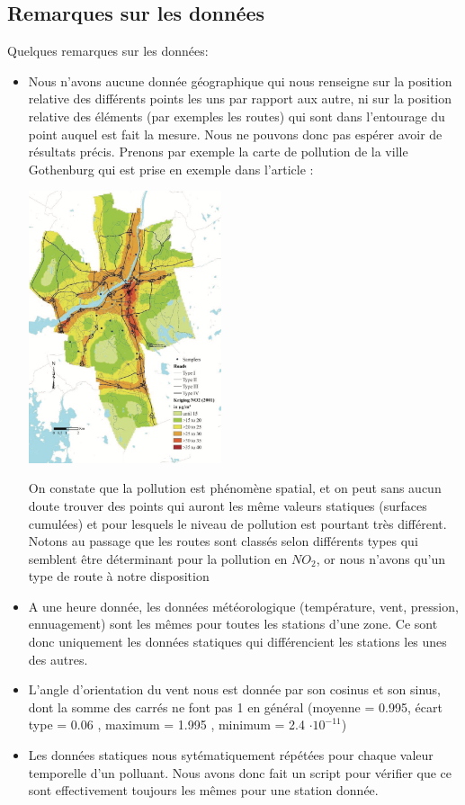 \subsection{Remarques sur les données}
Quelques remarques sur les données:
\begin{itemize}
  \item
    Nous n'avons aucune donnée géographique qui nous renseigne sur la position relative des différents points les uns par rapport aux autre, ni sur la position relative des éléments (par exemples les routes) qui sont dans l'entourage du point auquel est fait la mesure.
    Nous ne pouvons donc pas espérer avoir de résultats précis.
    Prenons par exemple la carte de pollution de la ville Gothenburg qui est prise en exemple dans l'article \cite{}:
    \begin{center}
    \includegraphics[height=8cm]{images/pollution_gothenburg.png}
    \end{center}
    On constate que la pollution est phénomène spatial, et on peut sans aucun doute trouver des points qui auront les même valeurs statiques (surfaces cumulées) et pour lesquels le niveau de pollution est pourtant très différent.
    Notons au passage que les routes sont classés selon différents types qui semblent être déterminant pour la pollution en $NO_2$, or nous n'avons qu'un type de route à notre disposition
  \item
    A une heure donnée, les données météorologique (température, vent, pression, ennuagement) sont les mêmes pour toutes les stations d'une zone.
    Ce sont donc uniquement les données statiques qui différencient les stations les unes des autres.
  \item
    L'angle d'orientation du vent nous est donnée par son cosinus et son sinus, dont la somme des carrés ne font pas 1 en général (moyenne = 0.995, écart type =  0.06 , maximum =  1.995 , minimum = 2.4 $\cdot 10^{-11}$)
  \item
    Les données statiques nous sytématiquement répétées pour chaque valeur temporelle d'un polluant.
    Nous avons donc fait un script pour vérifier que ce sont effectivement toujours les mêmes pour une station donnée.
\end{itemize}

